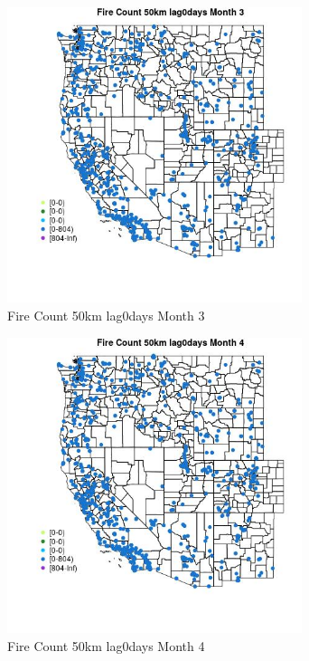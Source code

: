 \begin{figure} 
\centering  
\includegraphics[width=0.77\textwidth]{Code_Outputs/Report_ML_input_PM25_Step4_part_f_de_duplicated_aveswNAs_MapObsMo3Fire_Count_50km_lag0days.jpg} 
\caption{\label{fig:Report_ML_input_PM25_Step4_part_f_de_duplicated_aveswNAsMapObsMo3Fire_Count_50km_lag0days}Fire Count 50km lag0days Month 3} 
\end{figure} 
 

\begin{figure} 
\centering  
\includegraphics[width=0.77\textwidth]{Code_Outputs/Report_ML_input_PM25_Step4_part_f_de_duplicated_aveswNAs_MapObsMo4Fire_Count_50km_lag0days.jpg} 
\caption{\label{fig:Report_ML_input_PM25_Step4_part_f_de_duplicated_aveswNAsMapObsMo4Fire_Count_50km_lag0days}Fire Count 50km lag0days Month 4} 
\end{figure} 
 

